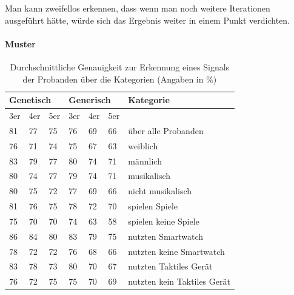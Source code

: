 Man kann zweifellos erkennen, dass wenn man noch weitere Iterationen ausgef{\"u}hrt h{\"a}tte, w{\"u}rde sich das Ergebnis weiter in einem Punkt verdichten. 



\paragraph{Muster}

\begin{table}[]
\centering
\caption{Durchschnittliche Genauigkeit zur Erkennung eines Signals der Probanden {\"u}ber die Kategorien (Angaben in \%)}
\label{MusterGenauigkeit}
\begin{tabular}{lll|lll|l}
\multicolumn{3}{l}{Genetisch} & \multicolumn{3}{|l|}{Generisch} & Kategorie      \\ \hline
3er    & 4er    & 5er   & 3er    & 4er    & 5er   &                             \\ \hline
81     & 77     & 75    & 76     & 69     & 66    & {\"u}ber alle Probanden         \\ \hline
76     & 71     & 74    & 75     & 67     & 63    & weiblich                    \\
83     & 79     & 77    & 80     & 74     & 71    & m{\"a}nnlich                    \\ \hline
80     & 74     & 77    & 79     & 74     & 71    & musikalisch                 \\
80     & 75     & 72    & 77     & 69     & 66    & nicht musikalisch           \\ \hline
81     & 76     & 75    & 78     & 72     & 70    & spielen Spiele              \\
75     & 70     & 70    & 74     & 63     & 58    & spielen keine Spiele        \\ \hline
86     & 84     & 80    & 83     & 79     & 75    & nutzten Smartwatch          \\
78     & 72     & 72    & 76     & 68     & 66    & nutzten keine Smartwatch    \\ \hline
83     & 78     & 73    & 80     & 70     & 67    & nutzten Taktiles Ger{\"a}t      \\
76     & 72     & 75    & 75     & 70     & 69    & nutzten kein Taktiles Ger{\"a}t
\end{tabular}
\end{table}

